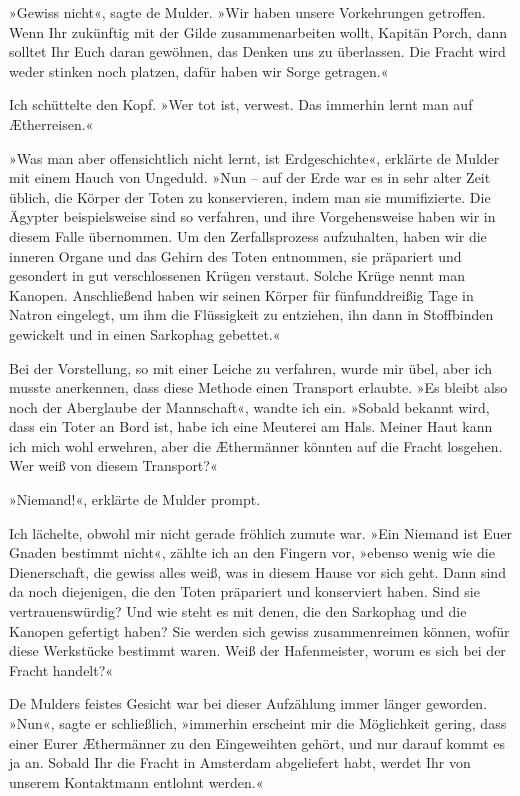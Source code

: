 »Gewiss nicht«, sagte de Mulder. »Wir haben unsere Vorkehrungen
getroffen. Wenn Ihr zukünftig mit der Gilde zusammenarbeiten wollt,
Kapitän Porch, dann solltet Ihr Euch daran gewöhnen, das Denken uns
zu überlassen. Die Fracht wird weder stinken noch platzen, dafür
haben wir Sorge getragen.«

Ich schüttelte den Kopf. »Wer tot ist, verwest. Das immerhin lernt
man auf Ætherreisen.«

»Was man aber offensichtlich nicht lernt, ist Erdgeschichte«,
erklärte de Mulder mit einem Hauch von Ungeduld. »Nun – auf der
Erde war es in sehr alter Zeit üblich, die Körper der Toten zu
konservieren, indem man sie mumifizierte. Die Ägypter
beispielsweise sind so verfahren, und ihre Vorgehensweise haben wir
in diesem Falle übernommen. Um den Zerfallsprozess aufzuhalten,
haben wir die inneren Organe und das Gehirn des Toten entnommen,
sie präpariert und gesondert in gut verschlossenen Krügen verstaut.
Solche Krüge nennt man Kanopen. Anschließend haben wir seinen
Körper für fünfunddreißig Tage in Natron eingelegt, um ihm die
Flüssigkeit zu entziehen, ihn dann in Stoffbinden gewickelt und in
einen Sarkophag gebettet.«

Bei der Vorstellung, so mit einer Leiche zu verfahren, wurde mir
übel, aber ich musste anerkennen, dass diese Methode einen
Transport erlaubte. »Es bleibt also noch der Aberglaube der
Mannschaft«, wandte ich ein. »Sobald bekannt wird, dass ein Toter
an Bord ist, habe ich eine Meuterei am Hals. Meiner Haut kann ich
mich wohl erwehren, aber die Æthermänner könnten auf die Fracht
losgehen. Wer weiß von diesem Transport?«

»Niemand!«, erklärte de Mulder prompt.

Ich lächelte, obwohl mir nicht gerade fröhlich zumute war. »Ein
Niemand ist Euer Gnaden bestimmt nicht«, zählte ich an den Fingern
vor, »ebenso wenig wie die Dienerschaft, die gewiss alles weiß, was
in diesem Hause vor sich geht. Dann sind da noch diejenigen, die
den Toten präpariert und konserviert haben. Sind sie
vertrauenswürdig? Und wie steht es mit denen, die den Sarkophag und
die Kanopen gefertigt haben? Sie werden sich gewiss zusammenreimen
können, wofür diese Werkstücke bestimmt waren. Weiß der
Hafenmeister, worum es sich bei der Fracht handelt?«

De Mulders feistes Gesicht war bei dieser Aufzählung immer länger
geworden. »Nun«, sagte er schließlich, »immerhin erscheint mir die
Möglichkeit gering, dass einer Eurer Æthermänner zu den
Eingeweihten gehört, und nur darauf kommt es ja an. Sobald Ihr die
Fracht in Amsterdam abgeliefert habt, werdet Ihr von unserem
Kontaktmann entlohnt werden.«

